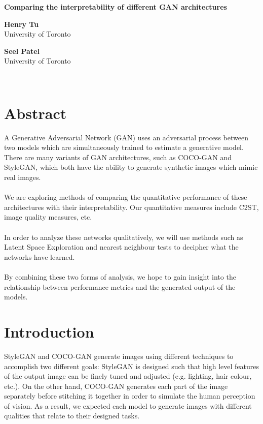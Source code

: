 \documentclass[10pt]{article}
\begin{document}
    \begin{center}
        \textbf{Comparing the interpretability of different GAN architectures}
    \end{center}
    \begin{minipage}{.5\textwidth}
        \centering
        \textbf{Henry Tu}\\
        University of Toronto
    \end{minipage}
    \begin{minipage}{.5\textwidth}
        \centering
        \textbf{Seel Patel}\\
        University of Toronto
    \end{minipage}
    \\
    \begin{multicols*}{2}
        \raggedcolumns

        \section{Abstract}
        \label{sec:abstract}
        A Generative Adversarial Network (GAN) uses an adversarial process between two models which are simultaneously trained to estimate a generative model.\cite{gan}
        There are many variants of GAN architectures, such as COCO-GAN\cite{cocogan} and StyleGAN\cite{stylegan}, which both have the ability to generate synthetic images which mimic real images.\\\\
        We are exploring methods of comparing the quantitative performance of these architectures with their interpretability.
        Our quantitative measures include C2ST\cite{evaluateGANs}, image quality measures\cite{evaluateGANs}, etc.\\\\
        In order to analyze these networks qualitatively, we will use methods such as Latent Space Exploration\cite{sampleGAN} and nearest neighbour tests\cite{evaluateGANs} to decipher what the networks have learned.\\\\
        By combining these two forms of analysis, we hope to gain insight into the relationship between performance metrics and the generated output of the models.

        \section{Introduction}
        \label{sec:introduction}
        StyleGAN and COCO-GAN generate images using different techniques to accomplish two different goals: StyleGAN is designed such that high level features of the output image can be finely tuned and adjusted (e.g. lighting, hair colour, etc.)\cite{stylegan}.
        On the other hand, COCO-GAN generates each part of the image separately before stitching it together in order to simulate the human perception of vision\cite{cocogan}.
        As a result, we expected each model to generate images with different qualities that relate to their designed tasks.

\end{multicols*}
\end{document}
